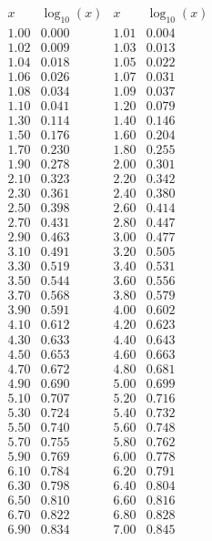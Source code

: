 \documentclass[10pt,twocolumn]{article}
\begin{document}
\[
\begin{array}{|c|c|c|c|}
\hline
x & \log_{10}(x) & x & \log_{10}(x) \\
\hline
1.00 & 0.000 & 1.01 & 0.004 \\
1.02 & 0.009 & 1.03 & 0.013 \\
1.04 & 0.018 & 1.05 & 0.022 \\
1.06 & 0.026 & 1.07 & 0.031 \\
1.08 & 0.034 & 1.09 & 0.037 \\
1.10 & 0.041 & 1.20 & 0.079 \\
1.30 & 0.114 & 1.40 & 0.146 \\
1.50 & 0.176 & 1.60 & 0.204 \\
1.70 & 0.230 & 1.80 & 0.255 \\
1.90 & 0.278 & 2.00 & 0.301 \\
2.10 & 0.323 & 2.20 & 0.342 \\
2.30 & 0.361 & 2.40 & 0.380 \\
2.50 & 0.398 & 2.60 & 0.414 \\
2.70 & 0.431 & 2.80 & 0.447 \\
2.90 & 0.463 & 3.00 & 0.477 \\
3.10 & 0.491 & 3.20 & 0.505 \\
3.30 & 0.519 & 3.40 & 0.531 \\
3.50 & 0.544 & 3.60 & 0.556 \\
3.70 & 0.568 & 3.80 & 0.579 \\
3.90 & 0.591 & 4.00 & 0.602 \\
4.10 & 0.612 & 4.20 & 0.623 \\
4.30 & 0.633 & 4.40 & 0.643 \\
4.50 & 0.653 & 4.60 & 0.663 \\
4.70 & 0.672 & 4.80 & 0.681 \\
4.90 & 0.690 & 5.00 & 0.699 \\
5.10 & 0.707 & 5.20 & 0.716 \\
5.30 & 0.724 & 5.40 & 0.732 \\
5.50 & 0.740 & 5.60 & 0.748 \\
5.70 & 0.755 & 5.80 & 0.762 \\
5.90 & 0.769 & 6.00 & 0.778 \\
6.10 & 0.784 & 6.20 & 0.791 \\
6.30 & 0.798 & 6.40 & 0.804 \\
6.50 & 0.810 & 6.60 & 0.816 \\
6.70 & 0.822 & 6.80 & 0.828 \\
6.90 & 0.834 & 7.00 & 0.845 \\

\end{array}\]
\end{document}
